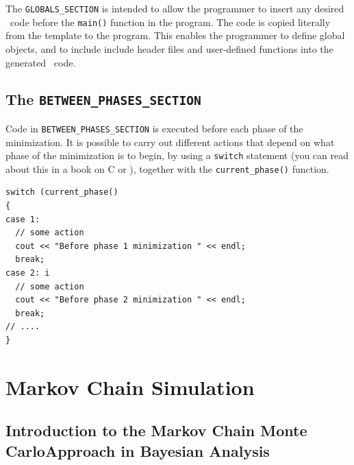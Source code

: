 \documentclass{admbmanual}
\begin{document}
The \texttt{GLOBALS\_SECTION} is intended to allow the programmer to insert any desired
\cplus\ code before the \texttt{main()} function in the program. The code is copied
literally from the template to the program. This enables the programmer to define
global objects, and to include include header files and user-defined functions into
the generated \cplus\ code.



\section{The \texttt{BETWEEN\_PHASES\_SECTION}}

Code  in \texttt{BETWEEN\_PHASES\_SECTION} is executed before each phase of the
minimization. It is possible to carry out different actions that depend
on what phase of the minimization is to begin, by using a \texttt{switch}
statement (you can read about this in a book on C or \cplus),
together with the \texttt{current\_phase()} function. 
\begin{lstlisting}
switch (current_phase()
{
case 1:
  // some action
  cout << "Before phase 1 minimization " << endl;
  break;
case 2: i
  // some action
  cout << "Before phase 2 minimization " << endl;
  break;
// ....
}
\end{lstlisting}



\chapter{Markov Chain Simulation}

\section{Introduction to the Markov Chain Monte Carlo\br Approach in Bayesian Analysis}
\end{document}
